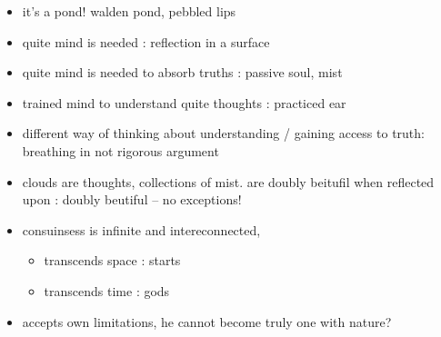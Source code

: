 \documentclass[letterpaper]{article}
\begin{document}
\begin{itemize}
\item it's a pond! walden pond, pebbled lips

\item quite mind is needed : reflection in a surface

\item quite mind is needed to absorb truths : passive soul, mist

\item trained mind to understand quite thoughts : practiced ear

\item different way of thinking about understanding / gaining access to
truth: breathing in not rigorous argument

\item clouds are thoughts, collections of mist. are doubly beitufil when
reflected upon : doubly beutiful -- no exceptions!

\item consuinsess is infinite and intereconnected,

\begin{itemize}
\item transcends space : starts
\item transcends time : gods
\end{itemize}

\item accepts own limitations, he cannot become truly one with nature?
\end{itemize}
\end{document}
